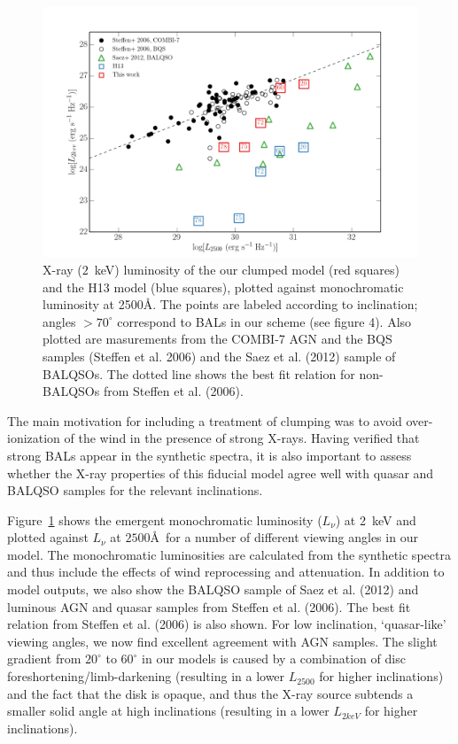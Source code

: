 \documentclass[useAMS,usenatbib]{mn2e_x}
\begin{document}
\begin{figure} %
\centering
\includegraphics[width=1.0\textwidth]{figures/lx_a05_pre.png}
\caption
{
X-ray ($2$~keV) luminosity of the our clumped model (red squares) 
and the H13 model (blue squares), plotted against monochromatic luminosity 
at 2500\AA. The points are labeled according to inclination; angles
$>70^\circ$ correspond to BALs in our scheme (see figure 4).
Also plotted are masurements from 
the COMBI-7 AGN and the BQS samples (Steffen et al. 2006) and the Saez et al. (2012) 
sample of BALQSOs. The dotted line shows the best fit relation for non-BALQSOs 
from Steffen et al. (2006).
}
\label{fig:xray}
\end{figure} %

The main motivation for including a treatment of clumping was
to avoid over-ionization of the wind in the presence of strong X-rays. 
Having verified that strong BALs appear in the synthetic spectra,
it is also important to assess whether the X-ray properties of this
fiducial model agree well with quasar and BALQSO samples for the relevant
inclinations.

Figure~\ref{fig:xray} shows the emergent
monochromatic luminosity ($L_\nu$) at 2~keV and 
plotted against $L_\nu$ at $2500$\AA\ for a number of different viewing angles in our model.
The monochromatic luminosities are calculated from the synthetic spectra and thus include
the effects of wind reprocessing and attenuation. In addition to model outputs,
we also show the BALQSO sample of Saez et al. (2012) and luminous AGN and quasar
samples from Steffen et al. (2006). The best fit relation from Steffen et al. (2006) 
is also shown. For low inclination, `quasar-like' viewing angles,
we now find excellent agreement with AGN samples. The slight gradient from $20^\circ$ to
$60^\circ$ in our models is caused by a combination of disc foreshortening/limb-darkening 
(resulting in a lower $L_{2500}$ for higher inclinations) and the fact that the disk 
is opaque, and thus the X-ray source subtends a smaller solid angle at high inclinations
(resulting in a lower $L_{2keV}$ for higher inclinations). 
\end{document}
